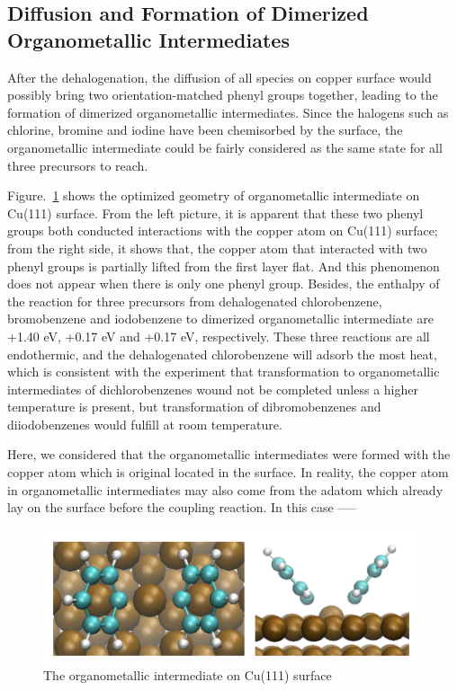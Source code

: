 \documentclass[aps,reprint,amsmath,amssymb]{revtex4-2}
\begin{document}
\subsection{Diffusion and Formation of Dimerized Organometallic Intermediates}

After the dehalogenation, the diffusion of all species on copper surface would possibly bring two orientation-matched phenyl groups together, leading to the formation of dimerized organometallic intermediates. Since the halogens such as chlorine, bromine and iodine have been chemisorbed by the surface, the organometallic intermediate could be fairly considered as the same state for all three precursors to reach.

Figure.~\ref{fig:organometallicintermediate} shows the optimized geometry of organometallic intermediate on Cu(111) surface. From the left picture, it is apparent that these two phenyl groups both conducted interactions with the copper atom on Cu(111) surface; from the right side, it shows that, the copper atom that interacted with two phenyl groups is partially lifted from the first layer flat. And this phenomenon does not appear when there is only one phenyl group. 
Besides, the enthalpy of the reaction for three precursors from dehalogenated chlorobenzene, bromobenzene and iodobenzene to dimerized organometallic intermediate are +1.40 eV, +0.17 eV and +0.17 eV, respectively. These three reactions are all endothermic, and the dehalogenated chlorobenzene will adsorb the most heat, which is consistent with the experiment that transformation to organometallic intermediates of dichlorobenzenes wound not be completed unless a higher temperature is present, but transformation of dibromobenzenes and diiodobenzenes would fulfill at room temperature.

Here, we considered that the organometallic intermediates were formed with the copper atom which is original located in the surface. In reality, the copper atom in organometallic intermediates may also come from the adatom which already lay on the surface before the coupling reaction. In this case -----

\begin{figure}[ht]
\centering
\includegraphics[width=0.98\textwidth]{Fig/organometallicintermediate.png}
\caption{The organometallic intermediate on Cu(111) surface}
\label{fig:organometallicintermediate}
\end{figure}
\end{document}
